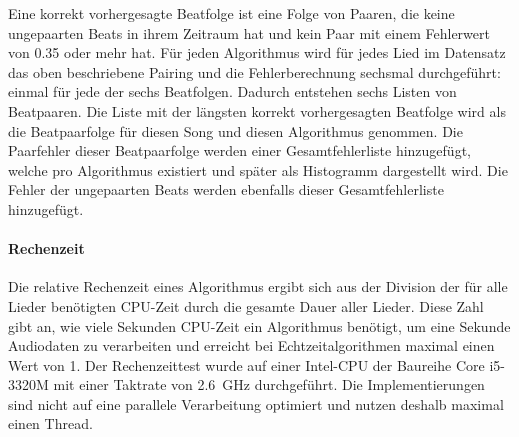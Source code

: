 {{{			%
			Eine korrekt vorhergesagte Beatfolge ist eine Folge von Paaren,
				die keine ungepaarten Beats in ihrem Zeitraum hat und
				kein Paar mit einem Fehlerwert von \num{0.35} oder mehr hat.
			Für jeden Algorithmus wird für jedes Lied im Datensatz das oben beschriebene Pairing und die Fehlerberechnung
				sechsmal durchgeführt:
				einmal für jede der sechs Beatfolgen.
			Dadurch entstehen sechs Listen von Beatpaaren.
			Die Liste mit der längsten korrekt vorhergesagten Beatfolge
				wird als die Beatpaarfolge für diesen Song und diesen Algorithmus genommen.
			Die Paarfehler dieser Beatpaarfolge werden einer Gesamtfehlerliste hinzugefügt,
				welche pro Algorithmus existiert und später als Histogramm dargestellt wird.
			Die Fehler der ungepaarten Beats werden ebenfalls dieser Gesamtfehlerliste hinzugefügt.
		}

		\paragraph{Rechenzeit}
		{
			Die relative Rechenzeit eines Algorithmus ergibt sich aus der Division der für alle Lieder benötigten \acs{CPU}-Zeit durch die gesamte Dauer aller Lieder.
			Diese Zahl gibt an,
				wie viele Sekunden \acs{CPU}-Zeit ein Algorithmus benötigt,
				um eine Sekunde Audiodaten zu verarbeiten
				und erreicht bei Echtzeitalgorithmen maximal einen Wert von \num{1}.
			Der Rechenzeittest wurde auf einer Intel-\ac{CPU} der Baureihe Core i5-3320M mit einer Taktrate von \SI{2.6}{\giga\hertz} durchgeführt.
			Die Implementierungen sind nicht auf eine parallele Verarbeitung optimiert
				und nutzen deshalb maximal einen Thread.
		}
	}
}

